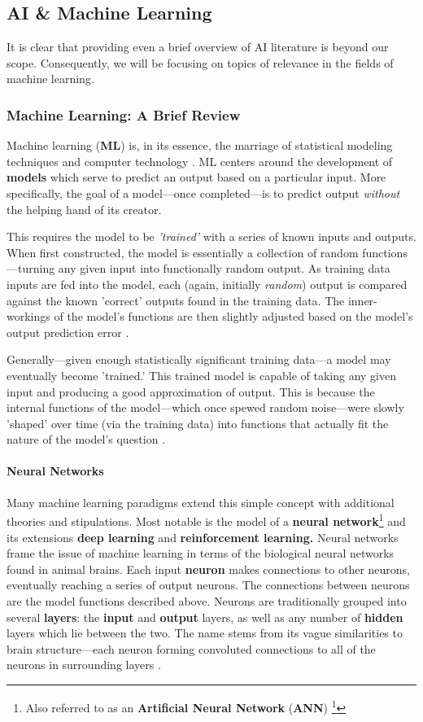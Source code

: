 \documentclass{report}
\newcommand{\tech}[1]{\textbf{#1}}
\begin{document}
\subsection{AI \& Machine Learning}
It is clear that providing even a brief overview of AI literature is beyond our scope. Consequently, we will be focusing on topics of relevance in the fields of machine learning.

\subsubsection{Machine Learning: A Brief Review}
Machine learning (\tech{ML}) is, in its essence, the marriage of statistical modeling techniques and computer technology \cite{mahesh2020machine}. ML centers around the development of \tech{models} which serve to predict an output based on a particular input. More specifically, the goal of a model---once completed---is to predict output \emph{without} the helping hand of its creator. 

This requires the model to be \emph{'trained'} with a series of known inputs and outputs. When first constructed, the model is essentially a collection of random functions---turning any given input into functionally random output. As training data inputs are fed into the model, each (again, initially \emph{random}) output is compared against the known 'correct' outputs found in the training data. The inner-workings of the model's functions are then slightly adjusted based on the model's output prediction error \cite{jordan2015machine}. 

Generally---given enough statistically significant training data---a model may eventually become 'trained.' This trained model is capable of taking any given input and producing a good approximation of output. This is because the internal functions of the model---which once spewed random noise---were slowly 'shaped' over time (via the training data) into functions that actually fit the nature of the model's question \cite{mahesh2020machine}. 

\paragraph{Neural Networks }

Many machine learning paradigms extend this simple concept with additional theories and stipulations. Most notable is the model of a \tech{neural network}\footnote{Also referred to as an \tech{Artificial Neural Network} (\tech{ANN}) \footnote{abiodun2018state}} and its extensions \tech{deep learning} and \tech{reinforcement learning.} Neural networks frame the issue of machine learning in terms of the biological neural networks found in animal brains. Each input \tech{neuron} makes connections to other neurons, eventually reaching a series of output neurons. The connections between neurons are the model functions described above. Neurons are traditionally grouped into several \tech{layers}: the \tech{input} and \tech{output} layers, as well as any number of \tech{hidden} layers which lie between the two. The name stems from its vague similarities to brain structure---each neuron forming convoluted connections to all of the neurons in surrounding layers \cite{dongare2012introduction}.
\end{document}
